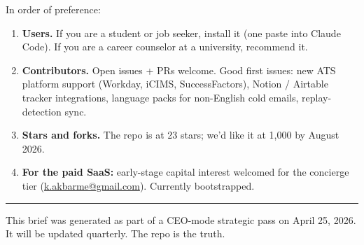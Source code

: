 \documentclass[11pt]{article}
\begin{document}
In order of preference:

\begin{enumerate}
  \item \textbf{Users.} If you are a student or job seeker, install it (one paste into Claude Code). If you are a career counselor at a university, recommend it.
  \item \textbf{Contributors.} Open issues + PRs welcome. Good first issues: new ATS platform support (Workday, iCIMS, SuccessFactors), Notion / Airtable tracker integrations, language packs for non-English cold emails, replay-detection sync.
  \item \textbf{Stars and forks.} The repo is at 23 stars; we'd like it at 1{,}000 by August 2026.
  \item \textbf{For the paid SaaS:} early-stage capital interest welcomed for the concierge tier (\href{mailto:k.akbarme@gmail.com}{k.akbarme@gmail.com}). Currently bootstrapped.
\end{enumerate}

\vspace{1em}
\hrule
\vspace{0.6em}
\noindent\small\color{muted}This brief was generated as part of a CEO-mode strategic pass on April 25, 2026. It will be updated quarterly. The repo is the truth.
\end{document}
